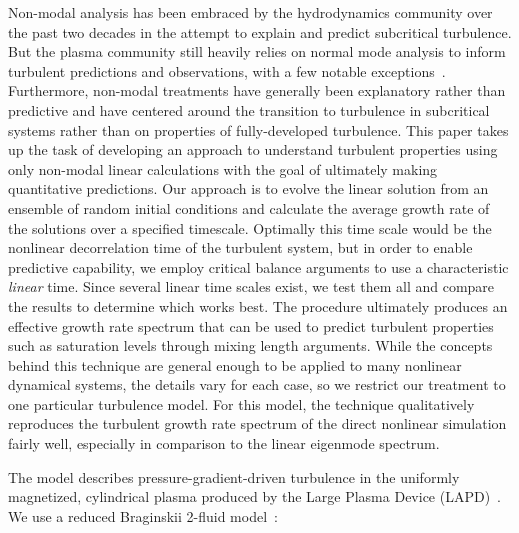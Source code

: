 \documentclass[letter,scriptaddress,twocolumn, prl,showkeys]{revtex4}
\begin{document}
Non-modal analysis has been embraced by the hydrodynamics community over the past two decades in the attempt to explain and predict subcritical turbulence. But the plasma community
still heavily relies on normal mode analysis to inform turbulent predictions and observations, with a few notable exceptions~\cite{camargo1998,camporeale2010,schekochihin2012}. 
Furthermore, non-modal treatments have generally been explanatory rather than predictive and have centered around the transition to turbulence in subcritical systems rather 
than on properties of fully-developed turbulence.
This paper takes up the task of developing an approach to understand turbulent properties using only non-modal linear calculations with the goal of 
ultimately making quantitative predictions. 
Our approach is to evolve the linear solution from an ensemble of random initial conditions 
and calculate the average growth rate of the solutions over a specified timescale.  Optimally this time scale would be the
nonlinear decorrelation time of the turbulent system, but in order to enable predictive capability, we employ critical balance
arguments to use a characteristic \emph{linear} time. Since several linear time scales exist, we test them all and compare the results to determine which works best.
The procedure ultimately produces an effective growth rate spectrum that can be used to predict turbulent properties such as saturation levels through mixing length arguments.
While the concepts behind this technique are general enough to be applied to many nonlinear dynamical systems, the details vary for each case, 
so we restrict our treatment to one particular turbulence model. For this model, the technique qualitatively reproduces the turbulent growth rate spectrum of the direct 
nonlinear simulation fairly well, especially in comparison to the linear eigenmode spectrum.

The model describes pressure-gradient-driven turbulence in the uniformly magnetized, cylindrical plasma
produced by the Large Plasma Device (LAPD)~\cite{gekelman1991}. 
We use a reduced Braginskii 2-fluid model~\cite{Popovich2010a,Popovich2010b,Umansky2011,friedman2012b,friedman2013}:
\end{document}
